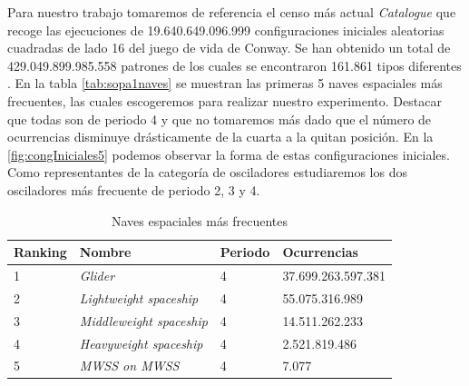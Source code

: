 \documentclass[../proyecto.tex]{memoir}
\begin{document}
Para nuestro trabajo tomaremos de referencia el censo más actual \textit{Catalogue} que recoge las ejecuciones de 19.640.649.096.999 configuraciones iniciales aleatorias cuadradas de lado 16 del juego de vida de Conway. Se han obtenido un total de 429.049.899.985.558 patrones de los cuales se encontraron 161.861 tipos diferentes \cite{sopa3}. En la tabla \autoref{tab:sopa1naves} se muestran las primeras 5 naves espaciales más frecuentes, las cuales escogeremos para realizar nuestro experimento. Destacar que todas son de periodo 4 y que no tomaremos más dado que el número de ocurrencias disminuye drásticamente de la cuarta a la quitan posición. En la \autoref{fig:congIniciales5} podemos observar la forma de estas configuraciones iniciales. Como representantes de la categoría de osciladores estudiaremos los dos osciladores más frecuente de periodo 2, 3 y 4.

\begin{table}[]
\centering
\begin{tabular}{|l|l|l|l|}
\hline
Ranking & Nombre                          & Periodo & Ocurrencias    \\ \hline
1       & \textit{Glider}                 & 4       & 37.699.263.597.381 \\ \hline
2       & \textit{Lightweight spaceship}  & 4       & 55.075.316.989     \\ \hline
3       & \textit{Middleweight spaceship} & 4       & 14.511.262.233      \\ \hline
4       & \textit{Heavyweight spaceship}  & 4       & 2.521.819.486      \\ \hline
5       & \textit{MWSS on MWSS}  & 4       & 7.077      \\ \hline
\end{tabular}
\caption{Naves espaciales más frecuentes}
\label{tab:sopa1naves}
\end{table}
\end{document}
